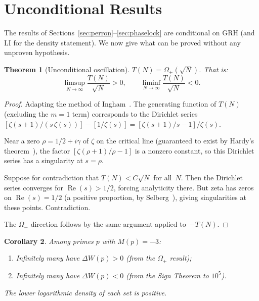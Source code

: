\documentclass[11pt]{article}
\newtheorem{theorem}{Theorem}[section]
\newtheorem{corollary}[theorem]{Corollary}
\theoremstyle{definition}
\begin{document}
\section{Unconditional Results}\label{sec:unconditional}

The results of Sections~\ref{sec:perron}--\ref{sec:phaselock} are
conditional on GRH (and LI for the density statement).  We now give
what can be proved without any unproven hypothesis.

\begin{theorem}[Unconditional oscillation]\label{thm:unconditional}
$T(N) = \Omega_\pm(\sqrt{N})$.  That is:
\[
  \limsup_{N \to \infty} \frac{T(N)}{\sqrt{N}} > 0, \qquad
  \liminf_{N \to \infty} \frac{T(N)}{\sqrt{N}} < 0.
\]
\end{theorem}

\begin{proof}
Adapting the method of Ingham~\cite{Ingham1942}.  The generating
function of $T(N)$ (excluding the $m = 1$ term) corresponds to the
Dirichlet series $[\zeta(s+1)/(s\,\zeta(s))] - [1/\zeta(s)]
= [\zeta(s+1)/s - 1]/\zeta(s)$.

Near a zero $\rho = 1/2 + i\gamma$ of $\zeta$ on the critical line
(guaranteed to exist by Hardy's theorem~\cite{Hardy1914}), the
factor $[\zeta(\rho+1)/\rho - 1]$ is a nonzero constant, so this
Dirichlet series has a singularity at $s = \rho$.

Suppose for contradiction that $T(N) < C\sqrt{N}$ for all~$N$.  Then
the Dirichlet series converges for $\operatorname{Re}(s) > 1/2$,
forcing analyticity there.  But zeta has zeros on
$\operatorname{Re}(s) = 1/2$ (a positive proportion, by
Selberg~\cite{Selberg1942}), giving singularities at these points.
Contradiction.

The $\Omega_-$ direction follows by the same argument applied
to~$-T(N)$.
\end{proof}

\begin{corollary}\label{cor:infinitely-many}
Among primes $p$ with $M(p) = -3$:
\begin{enumerate}[\upshape(a)]
  \item Infinitely many have $\Delta W(p) > 0$
    \textup{(from the $\Omega_+$ result)};
  \item Infinitely many have $\Delta W(p) < 0$
    \textup{(from the Sign Theorem to $10^5$)}.
\end{enumerate}
The lower logarithmic density of each set is positive.
\end{corollary}
\end{document}
